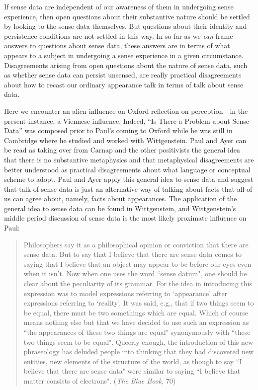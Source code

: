 \documentclass[11pt]{article}
\begin{document}
If sense data are independent of our awareness of them in undergoing sense experience, then open questions about their substantive nature should be settled by looking to the sense data themselves. But questions about their identity and persistence conditions are not settled in this way. In so far as we \emph{can} frame answers to questions about sense data, these answers are in terms of what appears to a subject in undergoing a sense experience in a given circumstance. Disagreements arising from open questions about the nature of sense data, such as whether sense data can persist unsensed, are really practical disagreements about how to recast our ordinary appearance talk in terms of talk about sense data.

Here we encounter an alien influence on Oxford reflection on perception---in the present instance, a Viennese influence. Indeed, ``Is There a Problem about Sense Data'' was composed prior to Paul's coming to Oxford while he was still in Cambridge where he studied and worked with Wittgenstein. 
Paul and Ayer can be read as taking over from Carnap and the other positivists the general idea that there is no substantive metaphysics and that metaphysical disagreements are better understood as practical disagreements about what language or conceptual scheme to adopt. Paul and Ayer apply this general idea to sense data and suggest that talk of sense data is just an alternative way of talking about facts that all of us can agree about, namely, facts about appearances. The application of the general idea to sense data can be found in Wittgenstein, and Wittgenstein's middle period discussion of sense data is the most likely proximate influence on Paul:\begin{quote}
    Philosophers say it as a philosophical opinion or conviction that there are sense data. But to say that I believe that there are sense data comes to saying that I believe that an object may appear to be before our eyes even when it isn't. Now when one uses the word ``sense datum", one should be clear about the peculiarity of its grammar. For the idea in introducing this expression was to model expressions referring to `appearance' after expressions referring to `reality'. It was said, e.g., that if two things seem to be equal, there must be two somethings which are equal. Which of course means nothing else but that we have decided to use such an expression as ``the appearances of these two things are equal" synonymously with ``these two things seem to be equal". Queerly enough, the introduction of this new phraseology has deluded people into thinking that they had discovered new entities, new elements of the structure of the world, as though to say ``I believe that there are sense data" were similar to saying ``I believe that matter consists of electrons". (\emph{The Blue Book}, 70)
\end{quote}
\end{document}
